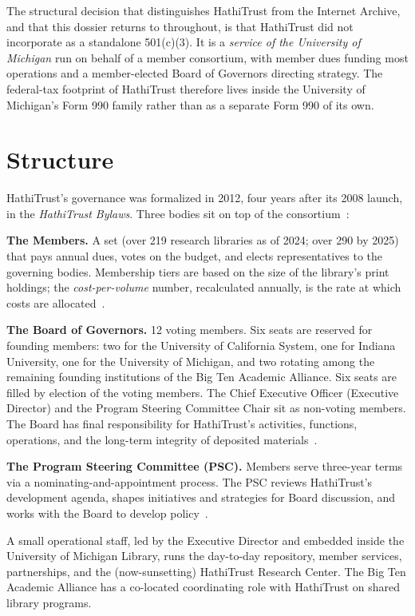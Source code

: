 \documentclass[10pt,letterpaper,twocolumn]{article}
\begin{document}
The structural decision that distinguishes HathiTrust from the Internet Archive, and that this dossier returns to throughout, is that HathiTrust did not incorporate as a standalone 501(c)(3). It is a \emph{service of the University of Michigan} run on behalf of a member consortium, with member dues funding most operations and a member-elected Board of Governors directing strategy. The federal-tax footprint of HathiTrust therefore lives inside the University of Michigan's Form 990 family rather than as a separate Form 990 of its own.

\section{Structure}

HathiTrust's governance was formalized in 2012, four years after its 2008 launch, in the \emph{HathiTrust Bylaws}. Three bodies sit on top of the consortium~\citep{hathigovern,btaagovernance}:

\textbf{The Members.} A set (over 219 research libraries as of 2024; over 290 by 2025) that pays annual dues, votes on the budget, and elects representatives to the governing bodies. Membership tiers are based on the size of the library's print holdings; the \emph{cost-per-volume} number, recalculated annually, is the rate at which costs are allocated~\citep{hathicost}.

\textbf{The Board of Governors.} 12 voting members. Six seats are reserved for founding members: two for the University of California System, one for Indiana University, one for the University of Michigan, and two rotating among the remaining founding institutions of the Big Ten Academic Alliance. Six seats are filled by election of the voting members. The Chief Executive Officer (Executive Director) and the Program Steering Committee Chair sit as non-voting members. The Board has final responsibility for HathiTrust's activities, functions, operations, and the long-term integrity of deposited materials~\citep{hathigovern}.

\textbf{The Program Steering Committee (PSC).} Members serve three-year terms via a nominating-and-appointment process. The PSC reviews HathiTrust's development agenda, shapes initiatives and strategies for Board discussion, and works with the Board to develop policy~\citep{hathipsc}.

A small operational staff, led by the Executive Director and embedded inside the University of Michigan Library, runs the day-to-day repository, member services, partnerships, and the (now-sunsetting) HathiTrust Research Center. The Big Ten Academic Alliance has a co-located coordinating role with HathiTrust on shared library programs.
\end{document}
